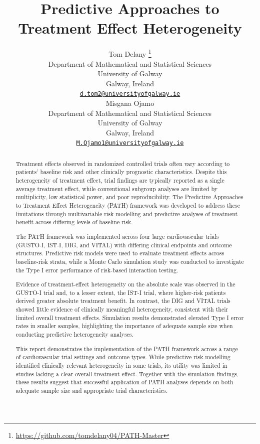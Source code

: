 \documentclass{article}
\title{Predictive Approaches to Treatment Effect Heterogeneity}
\author{
    Tom Delany
    \thanks{\url{https://github.com/tomdelany04/PATH-Master}}
   \\
    Department of Mathematical and Statistical Sciences \\
    University of Galway \\
  Galway, Ireland \\
  \texttt{\href{mailto:d.tom2@universityofgalway.ie}{\nolinkurl{d.tom2@universityofgalway.ie}}} \\
   \And
    Misgana Ojamo
   \\
    Department of Mathematical and Statistical Sciences \\
    University of Galway \\
  Galway, Ireland \\
  \texttt{\href{mailto:M.Ojamo1@universityofgalway.ie}{\nolinkurl{M.Ojamo1@universityofgalway.ie}}} \\
  }
\begin{document}
\maketitle


\begin{abstract}
Treatment effects observed in randomized controlled trials often vary
according to patients' baseline risk and other clinically prognostic
characteristics. Despite this heterogeneity of treatment effect, trial
findings are typically reported as a single average treatment effect,
while conventional subgroup analyses are limited by multiplicity, low
statistical power, and poor reproducibility. The Predictive Approaches
to Treatment Effect Heterogeneity (PATH) framework was developed to
address these limitations through multivariable risk modelling and
predictive analyses of treatment benefit across differing levels of
baseline risk.

The PATH framework was implemented across four large cardiovascular
trials (GUSTO-I, IST-I, DIG, and VITAL) with differing clinical
endpoints and outcome structures. Predictive risk models were used to
evaluate treatment effects across baseline-risk strata, while a Monte
Carlo simulation study was conducted to investigate the Type I error
performance of risk-based interaction testing.

Evidence of treatment-effect heterogeneity on the absolute scale was
observed in the GUSTO-I trial and, to a lesser extent, the IST-I trial,
where higher-risk patients derived greater absolute treatment benefit.
In contrast, the DIG and VITAL trials showed little evidence of
clinically meaningful heterogeneity, consistent with their limited
overall treatment effects. Simulation results demonstrated elevated Type
I error rates in smaller samples, highlighting the importance of
adequate sample size when conducting predictive heterogeneity analyses.

This report demonstrates the implementation of the PATH framework across
a range of cardiovascular trial settings and outcome types. While
predictive risk modelling identified clinically relevant heterogeneity
in some trials, its utility was limited in studies lacking a clear
overall treatment effect. Together with the simulation findings, these
results suggest that successful application of PATH analyses depends on
both adequate sample size and appropriate trial characteristics.
\end{abstract}

\end{document}
